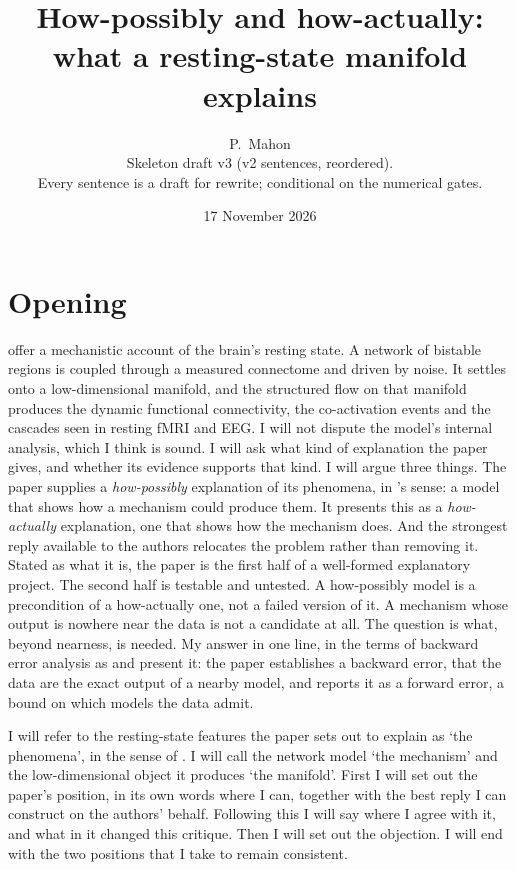 \documentclass[11pt]{article}
\title{How-possibly and how-actually:\\ what a resting-state manifold explains}
\author{P.~Mahon \\[2pt] \small Skeleton draft v3 (v2 sentences, reordered). \\ \small Every sentence is a draft for rewrite; conditional on the numerical gates.}
\date{17 November 2026}
\theoremstyle{definition}\newtheorem{observation}{Observation}
\theoremstyle{remark}\newtheorem{remark}{Remark}
\begin{document}
\maketitle

\section*{Opening}
\textcite{fousek2024} offer a mechanistic account of the brain's resting state. A network of bistable regions is coupled through a measured connectome and driven by noise. It settles onto a low-dimensional manifold, and the structured flow on that manifold produces the dynamic functional connectivity, the co-activation events and the cascades seen in resting fMRI and EEG. I will not dispute the model's internal analysis, which I think is sound. I will ask what kind of explanation the paper gives, and whether its evidence supports that kind. I will argue three things. The paper supplies a \emph{how-possibly} explanation of its phenomena, in \textcite{craver2006}'s sense: a model that shows how a mechanism could produce them. It presents this as a \emph{how-actually} explanation, one that shows how the mechanism does. And the strongest reply available to the authors relocates the problem rather than removing it. Stated as what it is, the paper is the first half of a well-formed explanatory project. The second half is testable and untested. A how-possibly model is a precondition of a how-actually one, not a failed version of it. A mechanism whose output is nowhere near the data is not a candidate at all. The question is what, beyond nearness, is needed. My answer in one line, in the terms of backward error analysis as \textcite{corless2016} and \textcite{fillion2014} present it: the paper establishes a backward error, that the data are the exact output of a nearby model, and reports it as a forward error, a bound on which models the data admit.

I will refer to the resting-state features the paper sets out to explain as `the phenomena', in the sense of \textcite{bogen1988}. I will call the network model `the mechanism' and the low-dimensional object it produces `the manifold'. First I will set out the paper's position, in its own words where I can, together with the best reply I can construct on the authors' behalf. Following this I will say where I agree with it, and what in it changed this critique. Then I will set out the objection. I will end with the two positions that I take to remain consistent.
\end{document}
